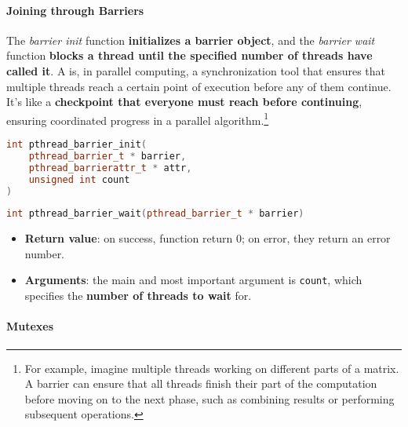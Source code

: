\newpage

\paragraph{Joining through Barriers}\label{paragraph: Joining through Barriers}

The \emph{barrier init} function \textbf{initializes a barrier object}, and the \emph{barrier wait} function \textbf{blocks a thread until the specified number of threads have called it}. A  is, in parallel computing, a synchronization tool that ensures that multiple threads reach a certain point of execution before any of them continue. It's like a \textbf{checkpoint that everyone must reach before continuing}, ensuring coordinated progress in a parallel algorithm.\footnote{For example, imagine multiple threads working on different parts of a matrix. A barrier can ensure that all threads finish their part of the computation before moving on to the next phase, such as combining results or performing subsequent operations.}
\begin{pthreadbox}
    \begin{lstlisting}[language=c++]
int pthread_barrier_init(
    pthread_barrier_t * barrier,
    pthread_barrierattr_t * attr,
    unsigned int count
)\end{lstlisting}
\end{pthreadbox}
\begin{pthreadbox}
    \begin{lstlisting}[language=c++]
int pthread_barrier_wait(pthread_barrier_t * barrier)\end{lstlisting}
\end{pthreadbox}
\begin{itemize}
    \item \textbf{Return value}: on success, function return 0; on error, they return an error number.
    \item \textbf{Arguments}: the main and most important argument is \texttt{count}, which specifies the \textbf{number of threads to wait} for.
\end{itemize}

\newpage

\paragraph{Mutexes}\label{paragraph: Mutexes}

